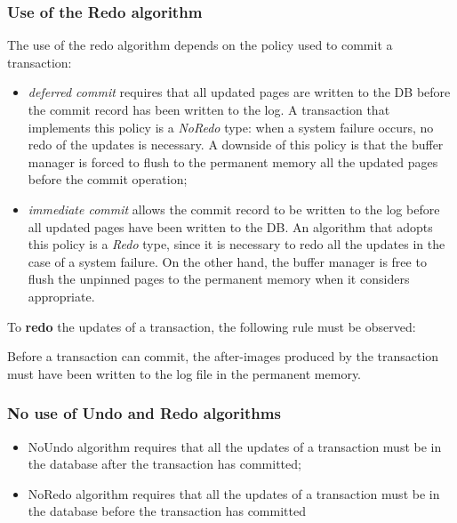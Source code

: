 \subsubsection{Use of the Redo algorithm}

The use of the redo algorithm depends on the policy used to commit a transaction:

\begin{itemize}

    \item \textit{deferred commit} requires that all updated pages are written to the DB before the commit record has been written to the log. A transaction that implements this policy is a \textit{NoRedo} type: when a system failure occurs, no redo of the updates is necessary. A downside of this policy is that the buffer manager is forced to flush to the permanent memory all the updated pages before the commit operation;

    \item \textit{immediate commit} allows the commit record to be written to the log before all updated pages have been written to the DB. An algorithm that adopts this policy is a \textit{Redo} type, since it is necessary to redo all the updates in the case of a system failure. On the other hand, the buffer manager is free to flush the unpinned pages to the permanent memory when it considers appropriate.

\end{itemize}

To \textbf{redo} the updates of a transaction, the following rule must be observed:

\begin{tcolorbox}[title = Redo rule (commit rule)]
    Before a transaction can commit, the after-images produced by the transaction must have been written to the log file in the permanent memory.
\end{tcolorbox}

\subsubsection{No use of Undo and Redo algorithms}

\begin{itemize}
    \item NoUndo algorithm requires that all the updates of a transaction must be in the database after the transaction has committed;
    \item NoRedo algorithm requires that all the updates of a transaction must be in the database before the transaction has committed
\end{itemize}

